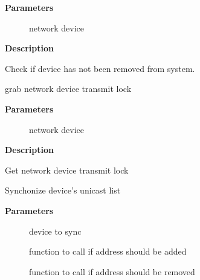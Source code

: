 \documentclass[a4paper,8pt,english]{sphinxmanual}
\begin{document}
\textbf{Parameters}
\begin{description}
\item[{}] \leavevmode
network device

\end{description}

\textbf{Description}

Check if device has not been removed from system.

\begin{fulllineitems}
\label{networking/kapi:c.netif_tx_lock}
grab network device transmit lock

\end{fulllineitems}


\textbf{Parameters}
\begin{description}
\item[{}] \leavevmode
network device

\end{description}

\textbf{Description}

Get network device transmit lock

\begin{fulllineitems}
\label{networking/kapi:c.__dev_uc_sync}
Synchonize device's unicast list

\end{fulllineitems}


\textbf{Parameters}
\begin{description}
\item[{}] \leavevmode
device to sync

\item[{}] \leavevmode
function to call if address should be added

\item[{}] \leavevmode
function to call if address should be removed

\end{description}
\end{document}
